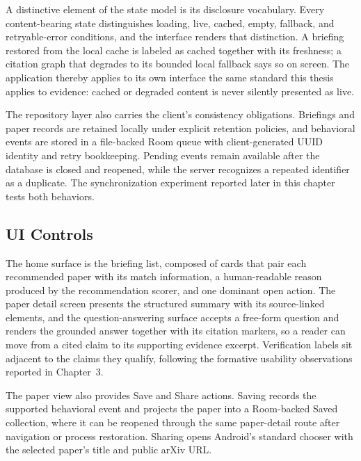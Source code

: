 A distinctive element of the state model is its disclosure vocabulary.
Every content-bearing state distinguishes loading, live, cached, empty, fallback, and retryable-error conditions, and the interface renders that distinction.
A briefing restored from the local cache is labeled as cached together with its freshness; a citation graph that degrades to its bounded local fallback says so on screen.
The application thereby applies to its own interface the same standard this thesis applies to evidence: cached or degraded content is never silently presented as live.

The repository layer also carries the client's consistency obligations.
Briefings and paper records are retained locally under explicit retention
policies, and behavioral events are stored in a file-backed Room queue with
client-generated UUID identity and retry bookkeeping. Pending events remain
available after the database is closed and reopened, while the server
recognizes a repeated identifier as a duplicate. The synchronization
experiment reported later in this chapter tests both behaviors.

\subsection{UI Controls}

The home surface is the briefing list, composed of cards that pair each recommended paper with its match information, a human-readable reason produced by the recommendation scorer, and one dominant open action.
The paper detail screen presents the structured summary with its source-linked elements, and the question-answering surface accepts a free-form question and renders the grounded answer together with its citation markers, so a reader can move from a cited claim to its supporting evidence excerpt.
Verification labels sit adjacent to the claims they qualify, following the formative usability observations reported in Chapter~3.

The paper view also provides Save and Share actions. Saving records the supported
behavioral event and projects the paper into a Room-backed Saved collection,
where it can be reopened through the same paper-detail route after navigation or
process restoration. Sharing opens Android's standard chooser with the selected
paper's title and public arXiv URL.

